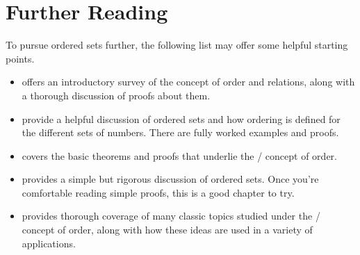 \documentclass[../../../main.tex]{subfiles}
\begin{document}
\chapter{Further Reading}

To pursue ordered sets further, the following list may offer some helpful starting points.

\begin{itemize}

  \item \citet[ch. 4]{Velleman2019} offers an introductory survey of the concept of order and relations, along with a thorough discussion of proofs about them.

  \item \citet[chs.~3, 5]{Warner2019} provide a helpful discussion of ordered sets and how ordering is defined for the different sets of numbers. There are fully worked examples and proofs.

  \item \citet[ch. 7]{Jongsma2019} covers the basic theorems and proofs that underlie the \mathical/ concept of order.
  
  \item \citet[ch. 4]{Pinter2014} provides a simple but rigorous discussion of ordered sets. Once you're comfortable reading simple proofs, this is a good chapter to try. 

  \item \citet{DaveyAndPriestly1990} provides thorough coverage of many classic topics studied under the \mathical/ concept of order, along with how these ideas are used in a variety of applications.

\end{itemize}
\end{document}
